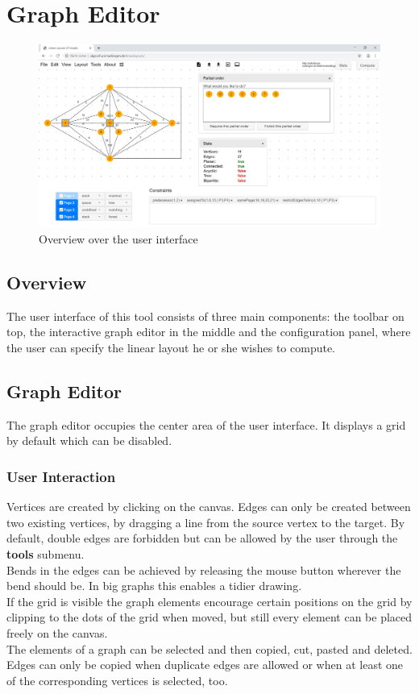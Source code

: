 \section{Graph Editor}
\begin{figure}[!h]
\begin{center}
\includegraphics[width=1\textwidth]{figures/figIndex/overviewIndex.jpg}
\caption{Overview over the user interface}
\label{img:overviewIndex}
\end{center}
\end{figure}
\subsection{Overview}
The user interface of this tool consists of three main components: the toolbar on top, the interactive graph editor in the middle and the configuration panel, where the user can specify the linear layout he or she wishes to compute.\\
\subsection{Graph Editor}
The graph editor occupies the center area of the user interface. It displays a grid by default which can be disabled.\\
\subsubsection{User Interaction}
Vertices are created by clicking on the canvas. Edges can only be created between two existing vertices, by dragging a line from the source vertex to the target. By default, double edges are forbidden but can be allowed by the user through the \textbf{tools} submenu.\\
Bends in the edges can be achieved by releasing the mouse button wherever the bend should be. In big graphs this enables a tidier drawing.\\
If the grid is visible the graph elements encourage certain positions on the grid by clipping to the dots of the grid when moved, but still every element can be placed freely on the canvas.\\
The elements of a graph can be selected and then copied, cut, pasted and deleted. Edges can only be copied when duplicate edges are allowed or when at least one of the corresponding vertices is selected, too.\\
